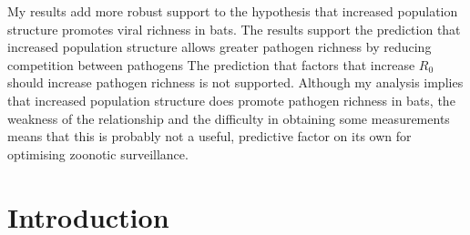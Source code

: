 My results add more robust support to the hypothesis that increased population structure promotes viral richness in bats.
The results support the prediction that increased population structure allows greater pathogen richness by reducing competition between pathogens
The prediction that factors that increase $R_0$ should increase pathogen richness is not supported.
%
%
Although my analysis implies that increased population structure does promote pathogen richness in bats, the weakness of the relationship and the difficulty in obtaining some measurements means that this is probably not a useful, predictive factor on its own for optimising zoonotic surveillance.






\section{Introduction}



